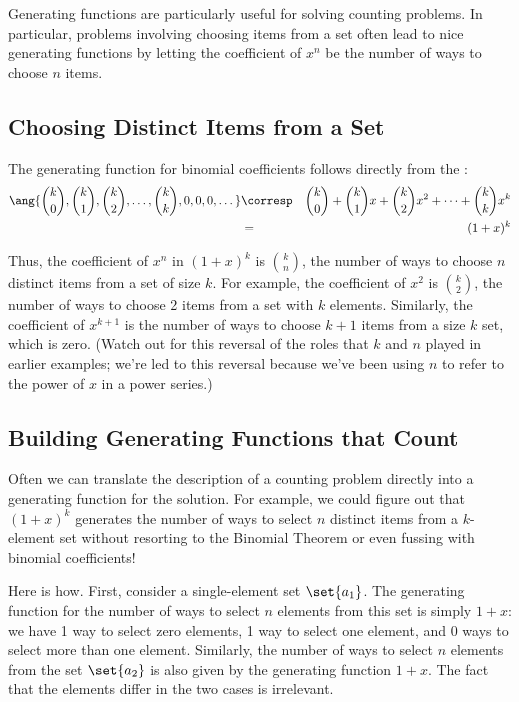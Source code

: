 Generating functions are particularly useful for solving counting
problems.  In particular, problems involving choosing items from a set
often lead to nice generating functions by letting the coefficient of
$x^n$ be the number of ways to choose $n$ items.

\subsection{Choosing Distinct Items from a Set}

The generating function for binomial coefficients follows directly
from the :
%
\begin{eqnarray*}
\ang{ \binom{k}{0}, \binom{k}{1}, \binom{k}{2}, \dots, \binom{k}{k},
        0, 0, 0, \dots }
    & \corresp & \binom{k}{0} + \binom{k}{1} x + \binom{k}{2} x^2 + \cdots + \binom{k}{k} x^k \\
    & = & (1 + x)^k
\end{eqnarray*}

Thus, the coefficient of $x^n$ in $(1 + x)^k$ is $\binom{k}{n}$, the
number of ways to choose $n$ distinct items from a set of size $k$.  For
example, the coefficient of $x^2$ is $\binom{k}{2}$, the number of ways to
choose 2 items from a set with $k$ elements.  Similarly, the coefficient
of $x^{k+1}$ is the number of ways to choose $k+1$ items from a size $k$
set, which is zero.  (Watch out for this reversal of the roles that $k$
and $n$ played in earlier examples; we're led to this reversal because
we've been using $n$ to refer to the power of $x$ in a power series.)

\subsection{Building Generating Functions that Count}

Often we can translate the description of a counting problem directly
into a generating function for the solution.  For example, we could
figure out that $(1 + x)^k$ generates the number of ways to select $n$
distinct items from a $k$-element set without resorting to the
Binomial Theorem or even fussing with binomial coefficients!

Here is how.  First, consider a single-element set $\set{a_1}$.  The
generating function for the number of ways to select $n$ elements from
this set is simply $1 + x$: we have 1 way to select zero elements, 1
way to select one element, and 0 ways to select more than one element.
Similarly, the number of ways to select $n$ elements from the set
$\set{a_2}$ is also given by the generating function $1 + x$.  The
fact that the elements differ in the two cases is irrelevant.


